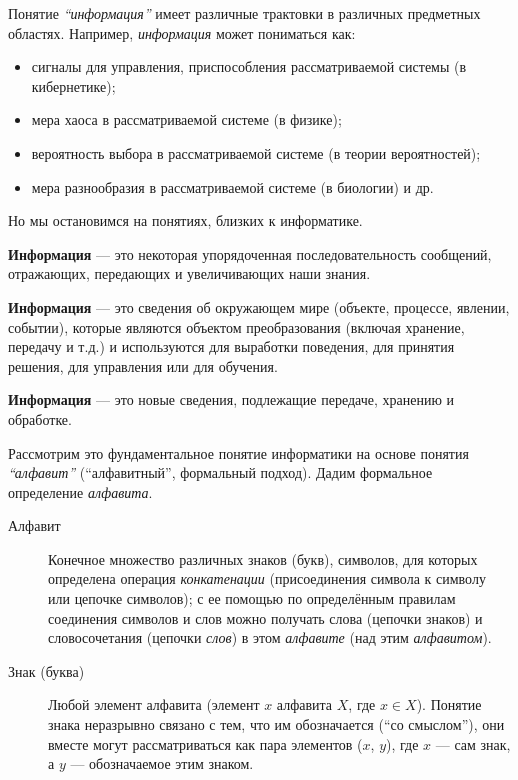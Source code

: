 Понятие \textit{\enquote{информация}} имеет различные трактовки в различных предметных областях. Например, \textit{информация} может пониматься как:
\begin{itemize}
    \item сигналы для управления, приспособления рассматриваемой системы (в кибернетике);
    \item мера хаоса в рассматриваемой системе (в физике);
    \item вероятность выбора в рассматриваемой системе (в теории вероятностей);
    \item мера разнообразия в рассматриваемой системе (в биологии) и др.
\end{itemize}

Но мы остановимся на понятиях, близких к информатике.

\textbf{Информация} --- это некоторая упорядоченная последовательность сообщений, отражающих, передающих и увеличивающих наши знания.

\textbf{Информация} --- это сведения об окружающем мире (объекте, процессе, явлении, событии), которые являются объектом преобразования (включая хранение, передачу и т.д.) и используются для выработки поведения, для принятия решения, для управления или для обучения.

\textbf{Информация} --- это новые сведения, подлежащие передаче, хранению и обработке.

Рассмотрим это фундаментальное понятие информатики на основе понятия \textit{\enquote{алфавит}} (\enquote{алфавитный}, формальный подход). Дадим формальное определение \textit{алфавита}.

\begin{description}
    \item [Алфавит]
          Конечное множество различных знаков (букв), символов, для которых определена операция \emph{конкатенации} (присоединения символа к символу или цепочке символов); с ее помощью по определённым правилам соединения символов и слов можно получать слова (цепочки знаков) и словосочетания (цепочки \textit{слов}) в этом \textit{алфавите} (над этим \textit{алфавитом}).

    \item [Знак (буква)]
          Любой элемент алфавита (элемент $x$ алфавита $X$, где $x \in X$). Понятие знака неразрывно связано с тем, что им обозначается (\enquote{со смыслом}), они вместе могут рассматриваться как пара элементов ($x$, $y$), где $x$ --- сам знак, а $y$ --- обозначаемое этим знаком.
\end{description}

